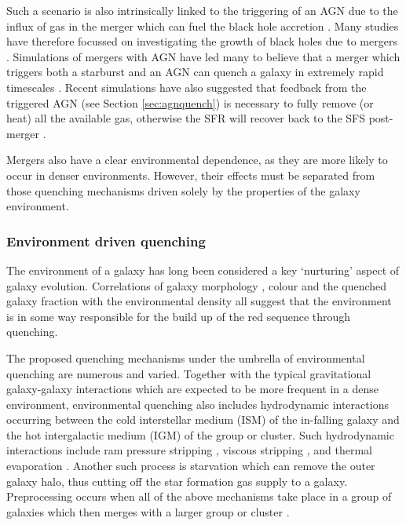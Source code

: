 Such a scenario is also intrinsically linked to the triggering of an AGN due to the influx of gas in the merger which can fuel the black hole accretion \citep{sanders88, dimatteo05, hopkins09a, treister12}. Many studies have therefore focussed on investigating the growth of black holes due to mergers \citep[e.g.][]{veilleux02, bellovary13, ellison13, medling15, gabor16}. Simulations of mergers with AGN have led many to believe that a merger which triggers both a starburst and an AGN can quench a galaxy in extremely rapid timescales \citep{springel05b, bell06}. Recent simulations have also suggested that feedback from the triggered AGN (see Section \ref{sec:agnquench}) is necessary to fully remove (or heat) all the available gas, otherwise the SFR will recover back to the SFS post-merger \citep{pontzen16, sparre16}. 

Mergers also have a clear environmental dependence, as they are more likely to occur in denser environments. However, their effects must be separated from those quenching mechanisms driven solely by the properties of the galaxy environment. 

\subsubsection{Environment driven quenching}\label{sec:envquench}

The environment of a galaxy has long been considered a key  `nurturing' aspect of galaxy evolution. Correlations of galaxy morphology \citep{dressler80, smail97, poggianti99, postman05, Bamford09}, colour \citep{butcher78, pimbblet02} and the quenched galaxy fraction \citep{kauffmann03, Baldry06, peng12, darvish16} with the environmental density all suggest that the environment is in some way responsible for the build up of the red sequence through quenching. 

The proposed quenching mechanisms under the umbrella of environmental quenching are numerous and varied. Together with the typical gravitational galaxy-galaxy interactions \citep{moore96} which are expected to be more frequent in a dense environment, environmental quenching also includes hydrodynamic interactions occurring between the cold interstellar medium (ISM) of the in-falling galaxy and the hot intergalactic medium (IGM) of the group or cluster. Such hydrodynamic interactions include ram pressure stripping \citep{gunngott72}, viscous stripping \citep{nulsen82}, and thermal evaporation \citep[a rapid rise in temperature of the ISM due to contact with the IGM;][]{cowie77}. Another such process is starvation \citep[also called strangulation;][]{larson80} which can remove the outer galaxy halo, thus cutting off the star formation gas supply to a galaxy. Preprocessing occurs when all of the above mechanisms take place in a group of galaxies which then merges with a larger group or cluster \citep{dressler04}. 

